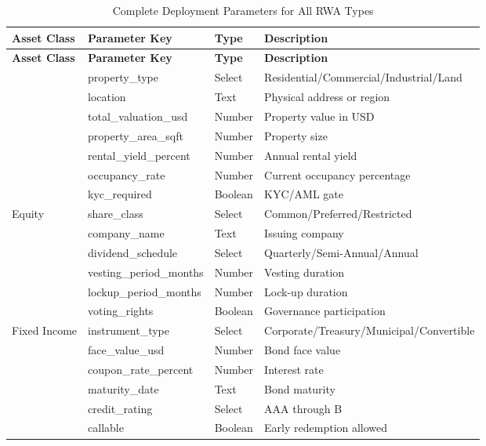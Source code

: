 \documentclass[11pt,a4paper,twoside]{article}
\begin{document}
\begin{longtable}{@{}llll@{}}
\caption{Complete Deployment Parameters for All RWA Types} \label{tab:all-params} \\
\toprule
\textbf{Asset Class} & \textbf{Parameter Key} & \textbf{Type} & \textbf{Description} \\
\midrule
\endfirsthead
\toprule
\textbf{Asset Class} & \textbf{Parameter Key} & \textbf{Type} & \textbf{Description} \\
\midrule
\endhead
\bottomrule
\endfoot

\multirow{7}{*}{Real Estate}
  & property\_type & Select & Residential/Commercial/Industrial/Land \\
  & location & Text & Physical address or region \\
  & total\_valuation\_usd & Number & Property value in USD \\
  & property\_area\_sqft & Number & Property size \\
  & rental\_yield\_percent & Number & Annual rental yield \\
  & occupancy\_rate & Number & Current occupancy percentage \\
  & kyc\_required & Boolean & KYC/AML gate \\
\midrule

\multirow{6}{*}{Equity}
  & share\_class & Select & Common/Preferred/Restricted \\
  & company\_name & Text & Issuing company \\
  & dividend\_schedule & Select & Quarterly/Semi-Annual/Annual \\
  & vesting\_period\_months & Number & Vesting duration \\
  & lockup\_period\_months & Number & Lock-up duration \\
  & voting\_rights & Boolean & Governance participation \\
\midrule

\multirow{6}{*}{Fixed Income}
  & instrument\_type & Select & Corporate/Treasury/Municipal/Convertible \\
  & face\_value\_usd & Number & Bond face value \\
  & coupon\_rate\_percent & Number & Interest rate \\
  & maturity\_date & Text & Bond maturity \\
  & credit\_rating & Select & AAA through B \\
  & callable & Boolean & Early redemption allowed \\
\midrule


\end{longtable}
\end{document}
